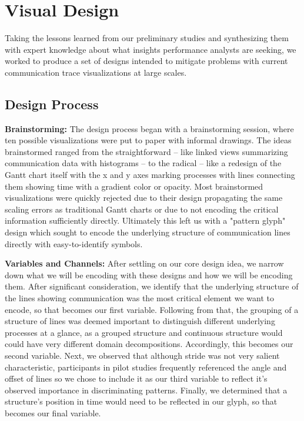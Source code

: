 



\section{Visual Design}
\label{sec:design}

Taking the lessons learned from our preliminary studies and synthesizing them with expert knowledge about what insights performance analysts are seeking, we worked to produce a set of designs intended to mitigate problems with current communication trace visualizations at large scales. 

\subsection{Design Process}

\textbf{Brainstorming:} The design process began with a brainstorming session, where ten possible visualizations were put to paper with informal drawings. The ideas brainstormed ranged from the straightforward -- like linked views summarizing communication data with histograms -- to the radical -- like a redesign of the Gantt chart itself with the x and y axes marking processes with lines connecting them showing time with a gradient color or opacity. Most brainstormed visualizations were quickly rejected due to their design propagating the same scaling errors as traditional Gantt charts or due to not encoding the critical information sufficiently directly. Ultimately this left us with a "pattern glyph" design which sought to encode the underlying structure of communication lines directly with easy-to-identify symbols.

\textbf{Variables and Channels:} After settling on our core design idea, we narrow down what we will be encoding with these designs and how we will be encoding them. After significant consideration, we identify that the underlying structure of the lines showing communication was the most critical element we want to encode, so that becomes our first variable. Following from that, the grouping of a structure of lines was deemed important to distinguish different underlying processes at a glance, as a grouped structure and continuous structure would could have very different domain decompositions. Accordingly, this becomes our second variable. Next, we observed that although stride was not very salient characteristic, participants in pilot studies frequently referenced the angle and offset of lines so we chose to include it as our third variable to reflect it's observed importance in discriminating patterns. Finally, we determined that a structure's position in time would need to be reflected in our glyph, so that becomes our final variable.

